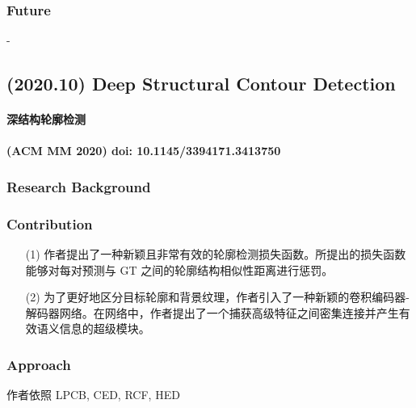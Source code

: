 \documentclass[a4paper, 10pt]{article}
\begin{document}
			\subsubsection{Future}
			-
			
		\subsection{(2020.10) Deep Structural Contour Detection}
		
		\paragraph{深结构轮廓检测}
		
		\paragraph{(ACM MM 2020) doi: 10.1145/3394171.3413750}

			\subsubsection{Research Background}
			
			
			\subsubsection{Contribution}
			
			\begin{itemize}
				\item[(1)]
				作者提出了一种新颖且非常有效的轮廓检测损失函数。所提出的损失函数能够对每对预测与 GT 之间的轮廓结构相似性距离进行惩罚。
				
				\item[(2)]
				为了更好地区分目标轮廓和背景纹理，作者引入了一种新颖的卷积编码器-解码器网络。在网络中，作者提出了一个捕获高级特征之间密集连接并产生有效语义信息的超级模块。
			\end{itemize}
			
			\subsubsection{Approach}
			
			作者依照 LPCB, CED, RCF, HED
			
\end{document}
